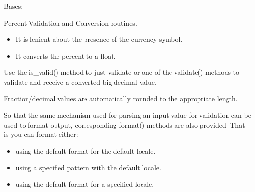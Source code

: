 \documentclass[letterpaper,10pt,english]{sphinxmanual}
\begin{document}
\begin{fulllineitems}
\label{\detokenize{apache_commons_validator_python.routines:apache_commons_validator_python.routines.percent_validator.PercentValidator}}
\pysigstartsignatures
{}
\pysigstopsignatures
\sphinxAtStartPar
Bases: {\hyperref[\detokenize{apache_commons_validator_python.routines:apache_commons_validator_python.routines.big_decimal_validator.BigDecimalValidator}]{}}

\sphinxAtStartPar
Percent Validation and Conversion routines.
\begin{description}
\begin{itemize}
\item {} 
\sphinxAtStartPar
It is lenient about the presence of the currency symbol.

\item {} 
\sphinxAtStartPar
It converts the percent to a float.

\end{itemize}

\end{description}

\sphinxAtStartPar
Use the is\_valid() method to just validate or one of the validate() methods to
validate and receive a converted big decimal value.

\sphinxAtStartPar
Fraction/decimal values are automatically rounded to the appropriate length.

\sphinxAtStartPar
So that the same mechanism used for parsing an input value for validation can be used to format output,
corresponding format() methods are also provided. That is you can format either:
\begin{itemize}
\item {} 
\sphinxAtStartPar
using the default format for the default locale.

\item {} 
\sphinxAtStartPar
using a specified pattern with the default locale.

\item {} 
\sphinxAtStartPar
using the default format for a specified locale.


\end{itemize}
\end{fulllineitems}
\end{document}
